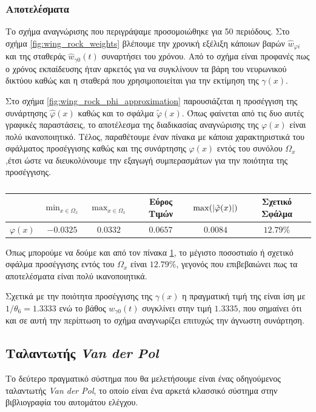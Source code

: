 \subsubsection{Αποτελέσματα}
Το σχήμα αναγνώρισης που περιγράψαμε προσομοιώθηκε για 50 περιόδους. Στο σχήμα \ref{fig:wing_rock_weights} βλέπουμε την χρονική εξέλιξη κάποιων βαρών $\hat{w}_{\varphi i}$ και της σταθεράς $\hat{w}_{\gamma 0}(t)$ συναρτήσει του χρόνου. Από το σχήμα είναι προφανές πως ο χρόνος εκπαίδευσης ήταν αρκετός για να συγκλίνουν τα βάρη του νευρωνικού δικτύου καθώς και η σταθερά που χρησιμοποιείται για την εκτίμηση της $\gamma(x)$.

Στο σχήμα \ref{fig:wing_rock_phi_approximation} παρουσιάζεται η προσέγγιση της συνάρτησης $\hat{\varphi}(x)$ καθώς και το σφάλμα $\tilde{\varphi}(x)$. Όπως φαίνεται από τις δυο αυτές γραφικές παραστάσεις, το αποτέλεσμα της διαδικασίας αναγνώρισης της $\varphi(x)$ είναι πολύ ικανοποιητικό. Τέλος, παραθέτουμε έναν πίνακα με κάποια χαρακτηριστικά του σφάλματος προσέγγισης καθώς και της συνάρτησης $\varphi(x)$ εντός του συνόλου $\Omega_x$ ,έτσι ώστε να διευκολύνουμε την εξαγωγή συμπερασμάτων για την ποιότητα της προσέγγισης.

\begin{table}[h!]
	\centering
	\begin{tabular}{  c | c | c | c | c | c }
		& $\min_{x \in \Omega_x}$ & $\max_{x \in \Omega_x}$ & Εύρος Τιμών & $\max(\abs{\tilde{\varphi}(x)})$ & Σχετικό Σφάλμα \\ \hline
		$\varphi(x)$ & $-0.0325$ & $0.0332$ & $0.0657$ & $0.0084$ & $12.79\%$ \\
	\end{tabular}
	\caption{}
	\label{tab:stat_of_function_wing_rock}
\end{table}

Όπως μπορούμε να δούμε και από τον πίνακα \ref{tab:stat_of_function_wing_rock}, το μέγιστο ποσοστιαίο ή σχετικό  σφάλμα προσέγγισης εντός του $\Omega_x$ είναι $12.79\%$, γεγονός που επιβεβαιώνει πως τα αποτελέσματα είναι πολύ ικανοποιητικά.

Σχετικά με την ποιότητα προσέγγισης της $\gamma(x)$ η πραγματική τιμή της είναι ίση με $1/\theta_6 = 1.3333$ ενώ το βάθος $w_{\gamma 0}(t)$ συγκλίνει στην τιμή $1.3335$, που σημαίνει ότι και σε αυτή την περίπτωση το σχήμα αναγνωρίζει επιτυχώς την άγνωστη συνάρτηση.


\subsection{Ταλαντωτής \textit{Van der Pol}}
Το δεύτερο πραγματικό σύστημα που θα μελετήσουμε είναι ένας οδηγούμενος ταλαντωτής \textit{Van der Pol}, το οποίο είναι ένα αρκετά κλασσικό σύστημα στην βιβλιογραφία του αυτομάτου ελέγχου. 

